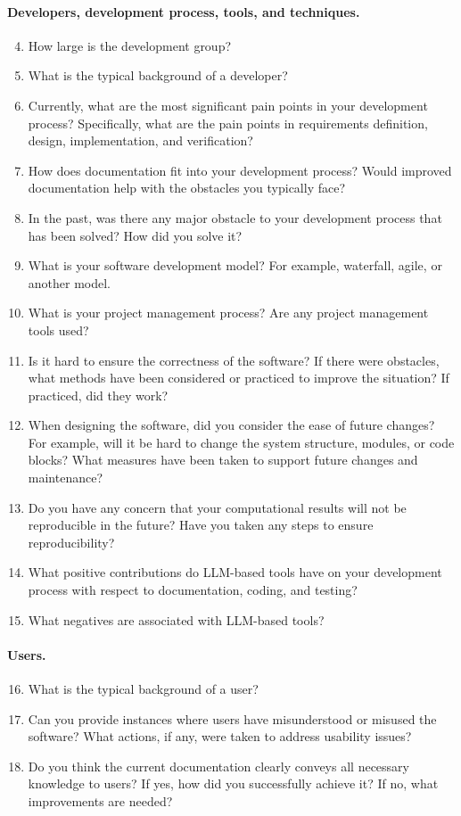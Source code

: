 \paragraph{Developers, development process, tools, and techniques.}
\begin{enumerate}
    \setcounter{enumi}{3}
    \item How large is the development group?
    \item What is the typical background of a developer?
    \item Currently, what are the most significant pain points in your development process? Specifically, what are the pain points in requirements definition, design, implementation, and verification?
    \item How does documentation fit into your development process? Would improved documentation help with the obstacles you typically face?
    \item In the past, was there any major obstacle to your development process that has been solved? How did you solve it?
    \item What is your software development model? For example, waterfall, agile, or another model.
    \item What is your project management process? Are any project management tools used?
    \item Is it hard to ensure the correctness of the software? If there were obstacles, what methods have been considered or practiced to improve the situation? If practiced, did they work?
    \item When designing the software, did you consider the ease of future changes? For example, will it be hard to change the system structure, modules, or code blocks? What measures have been taken to support future changes and maintenance?
    \item Do you have any concern that your computational results will not be reproducible in the future? Have you taken any steps to ensure reproducibility?
    \item What positive contributions do LLM-based tools have on your development process with respect to documentation, coding, and testing?
    \item What negatives are associated with LLM-based tools?
\end{enumerate}

\paragraph{Users.}
\begin{enumerate}
    \setcounter{enumi}{15}
    \item What is the typical background of a user?
    \item Can you provide instances where users have misunderstood or misused the software? What actions, if any, were taken to address usability issues?
    \item Do you think the current documentation clearly conveys all necessary knowledge to users? If yes, how did you successfully achieve it? If no, what improvements are needed?
\end{enumerate}
